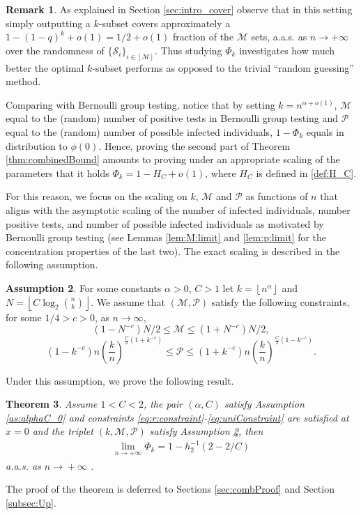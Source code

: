 \documentclass[12pt,reqno]{amsart}
\numberwithin{equation}{section}
\newtheorem{theorem}{Theorem}[section]
\theoremstyle{definition}
\newtheorem{assumption}[theorem]{Assumption}
\newtheorem{remark}[theorem]{Remark}
\newcommand{\floor}[1]{\left\lfloor #1 \right\rfloor}
\newcommand{\conv}[1]{\overset{#1}{\rightarrow}}
\renewcommand{\[}{\begin{equation}}
\renewcommand{\]}{\end{equation}}
\renewcommand{\|}{\bigg{|}}
\newcommand{\ngrow}{\ensuremath{n \conv{} +\infty} }
\newcommand{\mSet}{\mathcal{M}}
\newcommand{\pSet}{\mathcal{P}}
\newcommand{\err}{c}
\begin{document}
\begin{remark}
    As explained in Section \ref{sec:intro_cover} observe that in this setting simply outputting a $k$-subset covers approximately a $1-(1-q)^k+o(1)=1/2+o(1)$ fraction of the $\mSet$ sets, a.a.s. as $n \rightarrow +\infty$ over the randomness of $\{\mathcal{S}_i\}_{i \in [\mSet]}$. Thus studying $\Phi_k$ investigates how much better the optimal $k$-subset performs as opposed to the trivial ``random guessing'' method.
\end{remark}


 Comparing with Bernoulli group testing, notice that by setting $k=n^{\alpha+o(1)}$, $\mSet$ equal to the (random) number of positive tests in Bernoulli group testing and $\pSet$ equal to the (random) number of possible infected individuals, $1-\Phi_k$ equals in distribution to $\phi(0).$ Hence, proving the second part of Theorem \ref{thm:combinedBound} amounts to proving under an appropriate scaling of the parameters that it holds $\Phi_k=1-H_C+o(1)$, where $H_C$ is defined in \eqref{def:H_C}.

For this reason, we focus on the scaling on $k$, $\mSet$ and $\pSet$ as functions of $n$ that aligns with the asymptotic scaling of the number of infected individuals, number positive tests, and number of possible infected individuals as motivated by Bernoulli group testing (see Lemmas \ref{lem:M:limit} and \ref{lem:p:limit} for the concentration properties of the last two). The exact scaling is described in the following assumption.

\begin{assumption}\label{as:MPScale}
  For some constants $\alpha>0$, $C>1$ let $k=\floor{n^{\alpha}}$ and $N = \floor{C \log_2\binom{n}{k}}$. We assume that $(\mSet,\pSet)$ satisfy the following constraints, for some $1/4 > c > 0$, as $n \conv{} \infty$,
    \[(1-N^{-\err})N/2 \leq \mSet \leq (1 + N^{-\err})N/2,\]
    \[(1-k^{-\err})n\left( \frac{k}{n} \right)^{\frac{C}{2}(1+k^{-\err})} \leq \pSet \leq (1+k^{-\err})n\left( \frac{k}{n} \right)^{\frac{C}{2}(1-k^{-\err})}.\]
\end{assumption} 


Under this assumption, we prove the following result.
\begin{theorem}\label{thm:Phi_kLim}
    Assume $1 < C < 2$, the pair $(\alpha, C)$ satisfy Assumption \ref{as:alphaC_0} and constraints \eqref{eq:r:constraint}-\eqref{eq:uniConstraint} are satisfied at $x = 0$ and the triplet $(k,\mSet, \pSet)$ satisfy Assumption \ref{as:MPScale}, then
    \begin{align}\label{eq:phi_k}
        \lim_{n \rightarrow +\infty} \Phi_k = 1 - h^{-1}_2\left(2 - 2/C\right)
    \end{align}
    a.a.s. as \ngrow\!.
\end{theorem}The proof of the theorem is deferred to Sections \ref{sec:combProof} and Section \ref{subsec:Up}.
\end{document}
